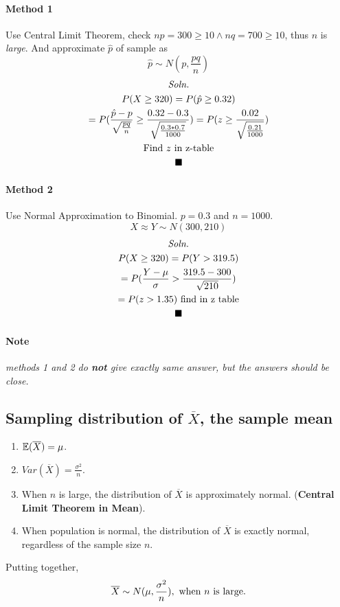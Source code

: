 \documentclass{article}
\begin{document}
			\paragraph{Method 1} Use Central Limit Theorem, check $np=300\geq10 \land nq = 700 \geq 10$, thus $n$ is \emph{large}. And approximate $\hat{p}$ of sample as
				\[
					\hat{p} \sim N(p, \frac{pq}{n})
				\]
				\begin{multline*}
					\emph{Soln.} \\
					P(X \geq 320) = P(\hat{p} \geq 0.32) \\
					= P(\frac{\hat{p} - p}{\sqrt{\frac{pq}{n}}} \geq \frac{0.32 - 0.3}{\sqrt{\frac{0.3*0.7}{1000}}}) = P(z \geq \frac{0.02}{\sqrt{\frac{0.21}{1000}}}) \\
					\text{{Find $z$ in z-table}} \\
					\blacksquare
				\end{multline*}
			
			\paragraph{Method 2} Use Normal Approximation to Binomial. $p=0.3$ and $n=1000$.
			\[
				X \approx Y \sim N(300, 210)
			\]
			\begin{multline*}
				\emph{Soln.} \\
				P(X \geq 320) = P(Y > 319.5) \\
				= P(\frac{Y - \mu}{\sigma} > \frac{319.5 - 300}{\sqrt{210}}) \\
				= P(z > 1.35) \text{{ find in z table}} \\
				\blacksquare
			\end{multline*}
			\paragraph{Note} \emph{methods 1 and 2 do \textbf{not} give exactly same answer, but the answers should be close.}
			
		\subsection{Sampling distribution of $\overline{X}$, the sample mean}
			\begin{enumerate}
				\item $\mathbb{E}({\overline{X}}) = \mu$.
				\item $Var(\overline{X}) = \frac{\sigma^2}{n}$.
				\item When $n$ is large, the distribution of $\overline{X}$ is approximately normal. (\textbf{Central Limit Theorem in Mean}).
				\item When population is normal, the distribution of $\overline{X}$ is exactly normal, regardless of the sample size $n$.
			\end{enumerate}
			Putting together,
				\[
					\overline{X} \sim N(\mu, \frac{\sigma^2}{n}), \text{{ when $n$ is large.}}
				\]
				
\end{document}
